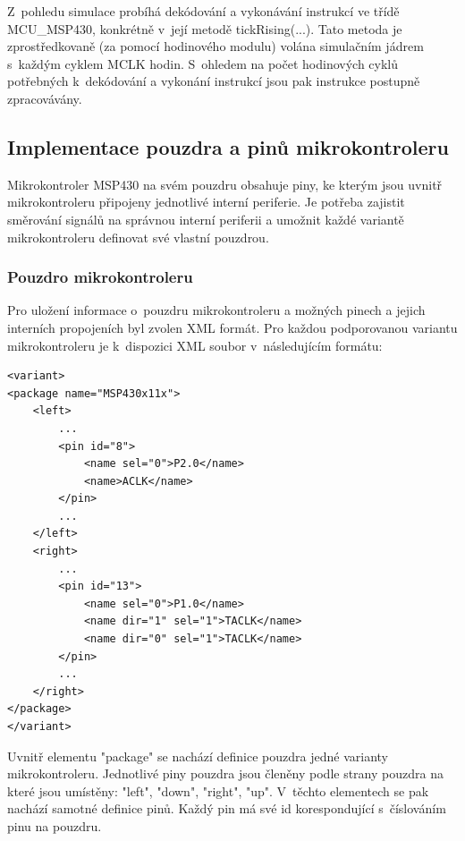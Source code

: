 Z~pohledu simulace probíhá dekódování a vykonávání instrukcí ve třídě MCU\_MSP430, konkrétně v~její metodě tickRising(...). Tato metoda je zprostředkovaně (za pomocí hodinového modulu) volána simulačním jádrem s~každým cyklem MCLK hodin. S~ohledem na počet hodinových cyklů potřebných k~dekódování a vykonání instrukcí jsou pak instrukce postupně zpracovávány.

\subsection{Implementace pouzdra a pinů mikrokontroleru}

Mikrokontroler MSP430 na svém pouzdru obsahuje piny, ke kterým jsou uvnitř mikrokontroleru připojeny jednotlivé interní periferie. Je potřeba zajistit směrování signálů na správnou interní periferii a umožnit každé variantě mikrokontroleru definovat své vlastní pouzdrou.

\subsubsection{Pouzdro mikrokontroleru}

Pro uložení informace o~pouzdru mikrokontroleru a možných pinech a jejich interních propojeních byl zvolen XML formát. Pro každou podporovanou variantu mikrokontroleru je k~dispozici XML soubor v~následujícím formátu:
\begin{lstlisting}
<variant>
<package name="MSP430x11x">
	<left>
		...
		<pin id="8">
			<name sel="0">P2.0</name>
			<name>ACLK</name>
		</pin>
		...
	</left>
	<right>
		...
		<pin id="13">
			<name sel="0">P1.0</name>
			<name dir="1" sel="1">TACLK</name>
			<name dir="0" sel="1">TACLK</name>
		</pin>
		...
	</right>
</package>
</variant>
\end{lstlisting}

Uvnitř elementu "package" se nachází definice pouzdra jedné varianty mikrokontroleru. Jednotlivé piny pouzdra jsou členěny podle strany pouzdra na které jsou umístěny: "left", "down", "right", "up". V~těchto elementech se pak nachází samotné definice pinů. Každý pin má své id korespondující s~číslováním pinu na pouzdru.

